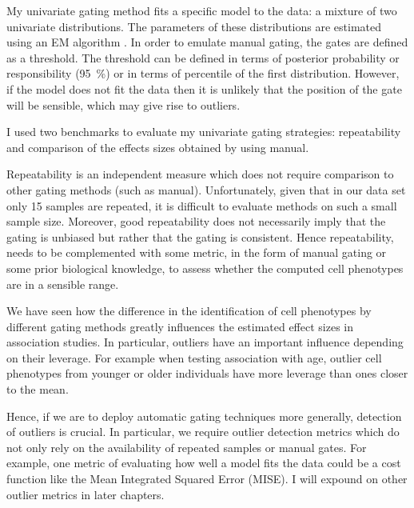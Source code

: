 My  univariate gating method fits a specific model to the data: a mixture of two univariate distributions.
The parameters of these distributions are estimated using an \Gls{EM} algorithm \citep{Dempster:1977ul}.
In order to emulate manual gating, the gates are defined as a threshold.
The threshold can be defined in terms of posterior probability or responsibility (\SI{95}{\percent})
or in terms of percentile of the first distribution.
However, if the model does not fit the data then it is unlikely that the position of the gate will be sensible,
which may give rise to outliers.

I used two benchmarks to evaluate my univariate gating strategies: repeatability and comparison of the effects sizes obtained 
by \citet{Dendrou:2009dv} using manual.

Repeatability is an independent measure which does not require comparison to other gating methods (such as manual).
Unfortunately, given that in our data set only 15 samples are repeated, it is difficult to evaluate methods on such a small sample size.
Moreover, good repeatability does not necessarily imply that the gating is unbiased but rather that the gating is consistent.
Hence repeatability, needs to be complemented with some metric, in the form of manual gating or some prior biological knowledge,
to assess whether the computed cell phenotypes are in a sensible range.

We have seen how the difference in the identification of cell phenotypes by different gating methods greatly influences the estimated effect sizes in association studies.
In particular, outliers have an important influence depending on their leverage.
For example when testing association with age, outlier cell phenotypes from younger or older individuals have more leverage than ones closer to the mean.

Hence, if we are to deploy automatic gating techniques more generally, detection of outliers is crucial.
In particular, we require outlier detection metrics which do not only rely on the availability of repeated samples or manual gates.
For example, one metric of evaluating how well a model fits the data could be a cost function like the Mean Integrated Squared Error (MISE).
I will expound on other outlier metrics in later chapters.

